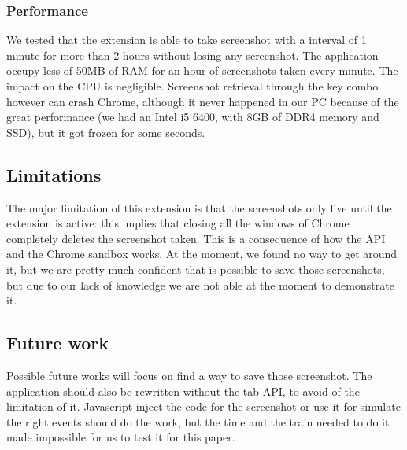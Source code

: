 \documentclass[12pt]{article}
\begin{document}
\begin{multicols}{2}
\subsubsection*{Performance}
We tested that the extension is able to take screenshot with a interval of 1 minute for more than 2 hours without losing any screenshot.
The application occupy less of 50MB of RAM for an hour of screenshots taken every minute. The impact on the CPU is negligible.
Screenshot retrieval through the key combo however can crash Chrome, although it never happened in our PC because of the great performance (we had an Intel i5 6400, with 8GB of DDR4 memory and SSD), but it got frozen for some seconds.
\subsection*{Limitations}
The major limitation of this extension is that the screenshots only live until the extension is active: this implies that closing all the windows of Chrome completely deletes the screenshot taken.
This is a consequence of how the API and the Chrome sandbox works. At the moment, we found no way to get around it, but we are pretty much confident that is possible to save those screenshots, but due to our lack of knowledge we are not able at the moment to demonstrate it.
\subsection*{Future work}
Possible future works will focus on find a way to save those screenshot.
The application should also be rewritten without the tab API, to avoid of the limitation of it.
Javascript inject the code for the screenshot or use it for simulate the right events should do the work, but the time and the train needed to do it made impossible for us to test it for this paper.

\end{multicols}
\end{document}
